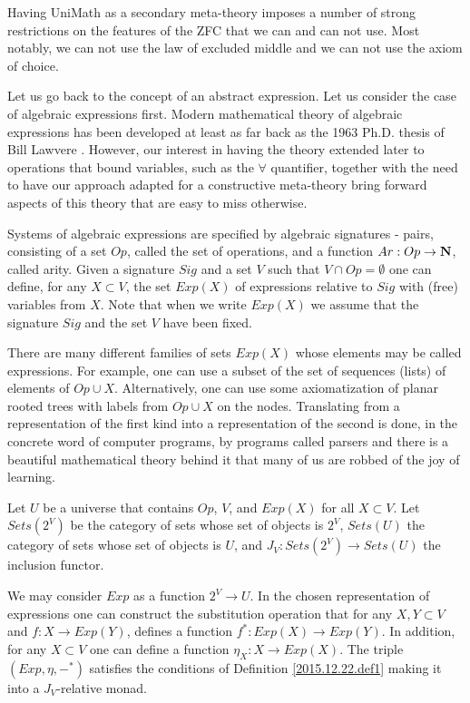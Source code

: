 \documentclass[12pt]{amsart}
\newcommand{\sr}{\rightarrow}
\newcommand{\nn}{{\bf N\rm}}
\newcommand{\nat}{\nn}
\newcommand{\mbind}[1]{{#1^*}}
\begin{document}
Having UniMath as a secondary meta-theory imposes a number of strong restrictions on the features of the ZFC that we can and can not use. Most notably, we can not use the law of excluded middle and we can not use the axiom of choice. 

Let us go back to the concept of an abstract expression. Let us consider the case of algebraic expressions first. Modern mathematical theory of algebraic expressions has been developed at least as far back as the 1963 Ph.D. thesis of Bill Lawvere \cite{Lawvere}. However, our interest in having the theory extended later to operations that bound variables, such as the $\forall$ quantifier, together with the need to have our approach adapted for a constructive meta-theory bring forward aspects of this theory that are easy to miss otherwise. 

Systems of algebraic expressions are specified by algebraic signatures - pairs, consisting of a set $Op$, called the set of operations, and a function $Ar:Op\sr \nat$, called arity. Given a signature $Sig$ and a set $V$ such that $V\cap Op=\emptyset$ one can define, for any $X\subset V$, the set $Exp(X)$ of expressions relative to $Sig$ with (free) variables from $X$. Note that when we write $Exp(X)$ we assume that the signature $Sig$ and the set $V$ have been fixed. 

There are many different families of sets $Exp(X)$ whose elements may be called expressions. For example, one can use a subset of the set of sequences (lists) of elements of $Op\cup X$. Alternatively, one can use some axiomatization of planar rooted trees with labels from $Op\cup X$ on the nodes. Translating from a representation of the first kind into a representation of the second is done, in the concrete word of computer programs, by programs called parsers and there is a beautiful mathematical theory behind it that many of us are robbed of the joy of learning. 

Let $U$ be a universe that contains $Op$, $V$, and $Exp(X)$ for all $X\subset V$. Let $Sets(2^V)$ be the category of sets whose set of objects is $2^V$, $Sets(U)$ the category of sets whose set of objects is $U$, and $J_V:Sets(2^V)\sr Sets(U)$ the inclusion functor. 

We may consider $Exp$ as a function $2^V\sr U$. In the chosen representation of expressions one can construct the substitution operation that for any $X,Y\subset V$ and $f:X\sr Exp(Y)$, defines a function $\mbind{f}:Exp(X)\sr Exp(Y)$. In addition, for any $X\subset V$ one can define a function $\eta_{X}:X\sr Exp(X)$. The triple $(Exp,\eta,\mbind{-})$ satisfies the conditions of Definition \ref{2015.12.22.def1} making it into a $J_V$-relative monad.
\end{document}
